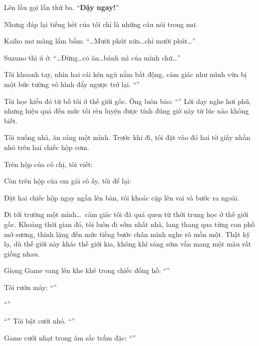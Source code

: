 \documentclass[../main.tex]{subfiles}
\begin{document}
Lên lầu gọi lần thứ ba. ``\textbf{Dậy ngay!}''

Nhưng đáp lại tiếng hét của tôi chỉ là những câu nói trong mơ.

Kaiho mơ màng lẩm bẩm: ``\dots Mười phút nữa\dots chỉ mười phút\dots''

Suzuno thì ú ớ: ``\dots Đừng\dots có ăn\dots bánh mì của mình chứ\dots''

Tôi khoanh tay, nhìn hai cái kén ngủ nằm bất động, cảm giác như mình vừa bị một bức tường vô hình đẩy ngược trở lại. ``''

Tôi học kiểu đó từ bố tôi ở thế giới gốc. Ông luôn bảo: ``'' Lời dạy nghe hơi phũ, nhưng hiệu quả đến mức tôi rèn luyện được tính đúng giờ này từ lúc nào không biết.

Tôi xuống nhà, ăn sáng một mình. Trước khi đi, tôi đặt vào đó hai tờ giấy nhắn nhỏ trên hai chiếc hộp cơm.

Trên hộp của cô chị, tôi viết:


Còn trên hộp của em gái cô ấy, tôi để lại:


Đặt hai chiếc hộp ngay ngắn lên bàn, tôi khoác cặp lên vai và bước ra ngoài.

\ct

Đi tới trường một mình\dots\ cảm giác tôi đã quá quen từ thời trung học ở thế giới gốc. Khoảng thời gian đó, tôi luôn đi sớm nhất nhà, lang thang qua từng con phố mờ sương, thinh lặng đến mức tiếng bước chân mình nghe rõ mồn một. Thật kỳ lạ, dù thế giới này khác thế giới kia, không khí sáng sớm vẫn mang một màu rất giống nhau.

Giọng Game vang lên khe khẽ trong chiếc đồng hồ: ``''

Tôi rướn mày: ``''

``''

``'' Tôi bật cười nhỏ. ``''

Game cười nhạt trong âm sắc trầm đặc: ``''
\end{document}
